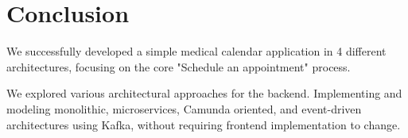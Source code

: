 \documentclass[11pt,english,a4paper,twoside]{article}
\begin{document}
\section{Conclusion}

We successfully developed a simple medical calendar application in 4
different architectures, focusing on the core "Schedule an appointment"
process.

We explored various architectural approaches for the backend.
Implementing and modeling monolithic, microservices, Camunda oriented, and
event-driven architectures using Kafka, without requiring frontend implementation
to change.
\end{document}
